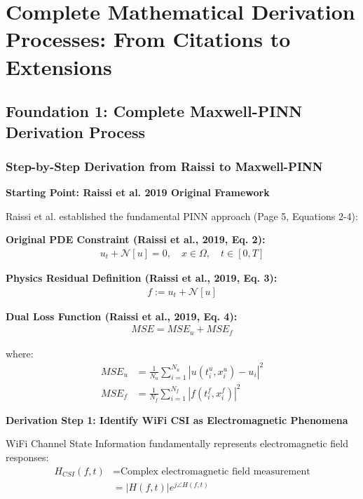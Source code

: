 \documentclass[12pt,a4paper]{article}
\begin{document}
\section{Complete Mathematical Derivation Processes: From Citations to Extensions}

\subsection{Foundation 1: Complete Maxwell-PINN Derivation Process}

\subsubsection{Step-by-Step Derivation from Raissi to Maxwell-PINN}

\textbf{Starting Point: Raissi et al. 2019 Original Framework}

Raissi et al. \cite{raissi2019physics} established the fundamental PINN approach (Page 5, Equations 2-4):

\textbf{Original PDE Constraint (Raissi et al., 2019, Eq. 2):}
\begin{align}
u_t + \mathcal{N}[u] = 0, \quad x \in \Omega, \quad t \in [0,T] \label{eq:raissi_original_pde}
\end{align}

\textbf{Physics Residual Definition (Raissi et al., 2019, Eq. 3):}
\begin{align}
f := u_t + \mathcal{N}[u] \label{eq:raissi_original_residual}
\end{align}

\textbf{Dual Loss Function (Raissi et al., 2019, Eq. 4):}
\begin{align}
MSE = MSE_u + MSE_f \label{eq:raissi_original_loss}
\end{align}

where:
\begin{align}
MSE_u &= \frac{1}{N_u} \sum_{i=1}^{N_u} |u(t_i^u, x_i^u) - u_i|^2 \label{eq:raissi_data_mse}\\
MSE_f &= \frac{1}{N_f} \sum_{i=1}^{N_f} |f(t_i^f, x_i^f)|^2 \label{eq:raissi_physics_mse}
\end{align}

\textbf{Derivation Step 1: Identify WiFi CSI as Electromagnetic Phenomena}

WiFi Channel State Information fundamentally represents electromagnetic field responses:
\begin{align}
H_{CSI}(f,t) &= \text{Complex electromagnetic field measurement} \nonumber\\
&= |H(f,t)| e^{j\angle H(f,t)} \label{eq:csi_em_representation}
\end{align}
\end{document}
